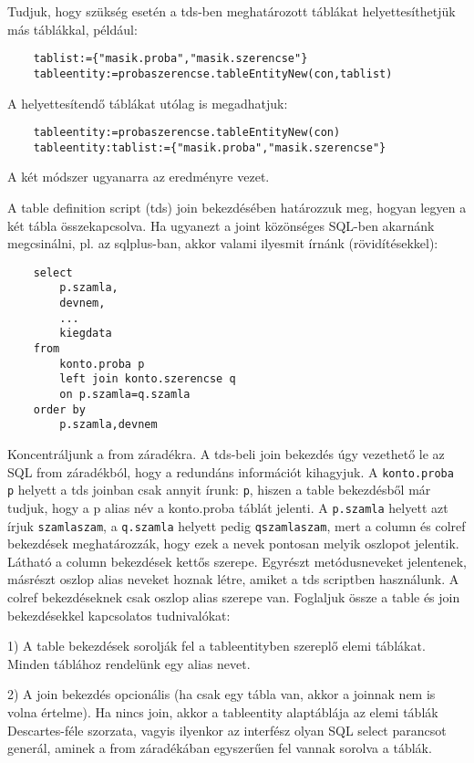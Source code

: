 Tudjuk, hogy szükség esetén a tds-ben meghatározott táblákat
helyettesíthetjük más táblákkal, például:
\begin{verbatim}
    tablist:={"masik.proba","masik.szerencse"}
    tableentity:=probaszerencse.tableEntityNew(con,tablist)
\end{verbatim}
A helyettesítendő táblákat utólag is megadhatjuk:
\begin{verbatim}
    tableentity:=probaszerencse.tableEntityNew(con)
    tableentity:tablist:={"masik.proba","masik.szerencse"}
\end{verbatim}
A két módszer ugyanarra az eredményre vezet.  

A table definition script (tds) join bekezdésében határozzuk meg,
hogyan legyen a két tábla összekapcsolva. Ha ugyanezt a joint
közönséges SQL-ben akarnánk megcsinálni, pl. az sqlplus-ban,
akkor valami ilyesmit írnánk (rövidítésekkel):
\begin{verbatim}
    select 
        p.szamla,
        devnem,
        ...
        kiegdata 
    from 
        konto.proba p 
        left join konto.szerencse q 
        on p.szamla=q.szamla 
    order by   
        p.szamla,devnem
\end{verbatim}
Koncentráljunk a from záradékra. A tds-beli join bekezdés úgy 
vezethető le az SQL from záradékból, hogy a redundáns információt
kihagyjuk. A \verb!konto.proba p! helyett a tds joinban csak annyit 
írunk: \verb!p!, hiszen a table bekezdésből már tudjuk, hogy a p alias 
név a konto.proba táblát jelenti. 
A \verb!p.szamla! helyett azt írjuk \verb!szamlaszam!,
a \verb!q.szamla! helyett pedig \verb!qszamlaszam!,
mert a column és colref bekezdések meghatározzák, 
hogy ezek a nevek pontosan melyik oszlopot jelentik.
Látható a column bekezdések kettős szerepe.
Egyrészt metódusneveket jelentenek, másrészt oszlop alias
neveket hoznak létre, amiket a tds scriptben használunk.
A colref bekezdéseknek csak oszlop alias szerepe van.
Foglaljuk össze a table és join bekezdésekkel kapcsolatos
tudnivalókat:

1) A table bekezdések sorolják fel a tableentityben szereplő
elemi táblákat. Minden táblához rendelünk egy alias nevet. 

2) A join bekezdés opcionális (ha csak egy tábla van, akkor a joinnak
nem is volna értelme). Ha nincs join, akkor a tableentity alaptáblája 
az elemi táblák Descartes-féle szorzata, vagyis ilyenkor az interfész olyan
SQL select parancsot generál, aminek a from záradékában egyszerűen fel 
vannak sorolva a táblák.

